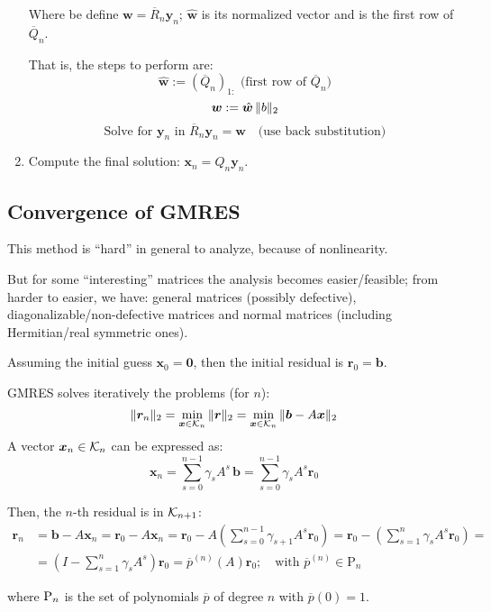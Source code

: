 \documentclass[
  12pt,
  paper=a4,
]{scrartcl} %
\begin{document}
\begin{enumerate}
    Where be define $\bm w=\overline R_n \bm y_n$; $\hat{\bm w}$ is its normalized vector and is the first row of $\overline Q_n$.
    
    That is, the steps to perform are:
    \[ \hat{\bm w} := (\overline Q_n)_{1:} \text{ (first row of $\overline Q_n$)} \]
    \[ {\bm w} := \hat{\bm w} \,\|b\|_2 \]
    \[ \text{Solve for } {\bm y}_n \text{ in }
        \overline R_n \bm y_n = \bm w
        \quad \text{(use back substitution)}
    \]

    \item Compute the final solution: $\bm x_n = Q_n\bm y_n$.

\end{enumerate}

\subsection*{Convergence of GMRES}

This method is ``hard'' in general to analyze, because of nonlinearity.

But for some ``interesting'' matrices the analysis becomes easier/feasible; from harder to easier, we have: general matrices (possibly defective), diagonalizable/non-defective matrices and normal matrices (including Hermitian/real symmetric ones).

Assuming the initial guess $\bm x_0=\bm 0$, then the initial residual is $\bm r_0=\bm b$.

GMRES solves iteratively the problems (for $n$):
\[
\|
    \bm r_n
\|_2=
\min_{\bm x\in \mathcal{K}_n}\|
    \bm r
\|_2=
\min_{\bm x\in \mathcal{K}_n}\|
    \bm b - A\bm x
\|_2
\]
A vector $\bm x_n\in \mathcal{K}_n$ can be expressed as:
\[
    \bm x_n = \sum_{s=0}^{n-1}
        \gamma_s A^s \,\bm b
        =\sum_{s=0}^{n-1} \gamma_s A^s \bm r_0
\]

Then, the $n$-th residual is in $\mathcal{K}_{n+1}$:
\begin{align*}
     \bm r_n &= \bm b - A\bm x_n
    =\bm r_0 - A\bm x_n
    =\bm r_0 - A\left(
        \sum_{s=0}^{n-1} \gamma_{s+1} A^s \bm r_0
    \right)=
    \bm r_0 - \left(
        \sum_{s=1}^{n} \gamma_{s} A^s \bm r_0
    \right)=
    \\
    &=
     \left(I - 
        \sum_{s=1}^{n} \gamma_{s} A^s
    \right) \bm r_0
    =\overline{p}^{(n)}(A)\bm r_0; \quad
    \text{with }
    \overline{p}^{(n)} \in \mathrm{P}_n
\end{align*}

where $\mathrm{P}_n$ is the set of polynomials $\overline{p}$ of degree $n$ with $\overline{p}(0)=1$.
\end{document}
